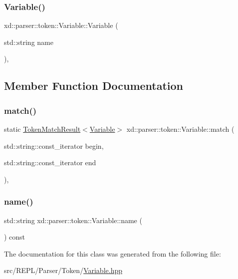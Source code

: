 \subsubsection{\texorpdfstring{Variable()}{Variable()}}
{\footnotesize\ttfamily xd\+::parser\+::token\+::\+Variable\+::\+Variable (\begin{DoxyParamCaption}\item[{std\+::string}]{name }\end{DoxyParamCaption})\hspace{0.3cm}{\ttfamily [inline]}, {\ttfamily [explicit]}}



\subsection{Member Function Documentation}
\mbox{\label{classxd_1_1parser_1_1token_1_1_variable_a396dddf497f54896eba05baa21ac8782}} 
\subsubsection{\texorpdfstring{match()}{match()}}
{\footnotesize\ttfamily static \mbox{\hyperlink{namespacexd_1_1parser_1_1token_a766c52bbfb7cb1f08498ef0bb9ec756e}{Token\+Match\+Result}}$<$\mbox{\hyperlink{classxd_1_1parser_1_1token_1_1_variable}{Variable}}$>$ xd\+::parser\+::token\+::\+Variable\+::match (\begin{DoxyParamCaption}\item[{std\+::string\+::const\+\_\+iterator}]{begin,  }\item[{std\+::string\+::const\+\_\+iterator}]{end }\end{DoxyParamCaption})\hspace{0.3cm}{\ttfamily [inline]}, {\ttfamily [static]}}

\mbox{\label{classxd_1_1parser_1_1token_1_1_variable_a12b4673d212c5b7b8ac9bca8efa61775}} 
\subsubsection{\texorpdfstring{name()}{name()}}
{\footnotesize\ttfamily std\+::string xd\+::parser\+::token\+::\+Variable\+::name (\begin{DoxyParamCaption}{ }\end{DoxyParamCaption}) const\hspace{0.3cm}{\ttfamily [inline]}}



The documentation for this class was generated from the following file\+:\begin{DoxyCompactItemize}
\item 
src/\+R\+E\+P\+L/\+Parser/\+Token/\mbox{\hyperlink{_variable_8hpp}{Variable.\+hpp}}\end{DoxyCompactItemize}
